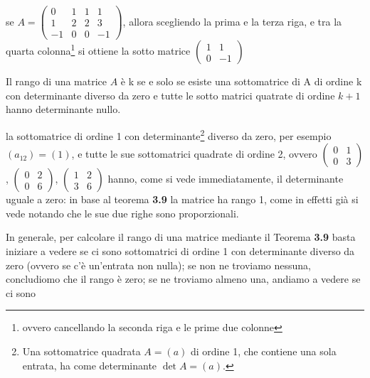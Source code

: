 \begin{teorema}
\begin{osservazione}
  \end{osservazione}
  \begin{esempio}
    se $A=
    \begin{pmatrix}
      0 & 1 & 1 &1 \\
      1 & 2 & 2 & 3 \\
      -1 & 0 &0 & -1
    \end{pmatrix}
    $, allora scegliendo la prima e la terza riga, e tra la quarta colonna\footnote{ovvero cancellando la seconda
    riga e le prime due colonne} si ottiene la sotto matrice $
  \begin{pmatrix}
    1 &1 \\
    0 & -1 
  \end{pmatrix}
  $
  \end{esempio}
\end{teorema}
 \begin{teorema}\label{3.9}
  Il rango di una matrice $A$ è k se e solo se esiste una sottomatrice di A di ordine k con determinante diverso
  da zero e tutte le sotto matrici quatrate di ordine $k+1$ hanno determinante nullo. 
\end{teorema}
\begin{esempio}
    la sottomatrice di ordine 1 con determinante\footnote{Una sottomatrice quadrata $A=(a)$
      di ordine 1, che contiene una sola entrata, ha come determinante $\det A=(a)$.} diverso da zero, per esempio
    $(a_{12})=(1)$, e tutte le sue sottomatrici quadrate di ordine 2, ovvero $
    \begin{pmatrix}
      0 & 1\\
      0 & 3
    \end{pmatrix}
    $,
    $
    \begin{pmatrix}
      0 &2 \\
      0 & 6
    \end{pmatrix}
    $, $
    \begin{pmatrix}
      1 &2\\
      3 & 6
    \end{pmatrix}
    $ hanno, come si vede immediatamente, il determinante uguale a zero: in base al teorema \textbf{3.9} la
    matrice ha rango 1, come in effetti già si vede notando che le sue due righe sono proporzionali.
\end{esempio}
In generale, per calcolare il rango di una matrice mediante il Teorema \textbf{3.9} basta iniziare a vedere se ci
sono sottomatrici di ordine 1 con determinante diverso da zero (ovvero se c'è un'entrata non nulla); se non ne
troviamo nessuna, concludiomo che il rango è zero; se ne troviamo almeno una, andiamo a vedere se ci sono
